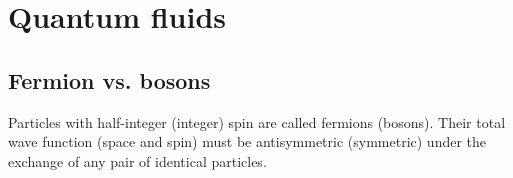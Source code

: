 \section{Quantum fluids}
\subsection*{Fermion vs. bosons}
Particles with half-integer (integer) spin are called fermions (bosons). Their
total wave function (space and spin) must be antisymmetric (symmetric)
under the exchange of any pair of identical particles.
